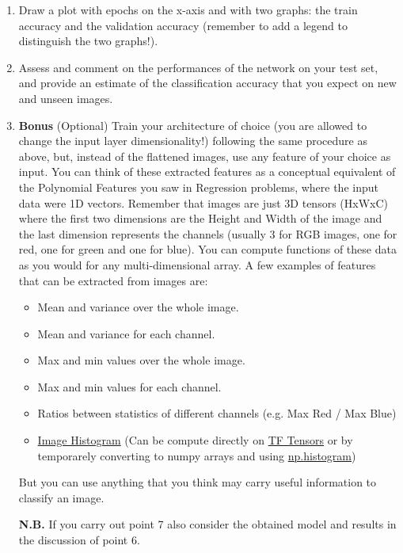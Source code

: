 \documentclass[11pt]{scrartcl}
\begin{document}
\begin{enumerate}
\item Draw a plot with epochs on the x-axis and with two graphs: the train accuracy and the validation accuracy (remember to add a legend to distinguish the two graphs!).
\item Assess and comment on the performances of the network on your test set, and provide an estimate of the classification accuracy that you expect on new and unseen images. 
\item \textbf{Bonus} (Optional) Train your architecture of choice (you are allowed to change the input layer dimensionality!) following the same procedure as above, but, instead of the flattened images, use any feature of your choice as input. 
You can think of these extracted features as a conceptual equivalent of the Polynomial Features you saw in Regression problems, where the input data were 1D vectors. 
Remember that images are just 3D tensors (HxWxC) where the first two dimensions are the Height and Width of the image and the last dimension represents the channels (usually 3 for RGB images, one for red, one for green and one for blue). 
You can compute functions of these data as you would for any multi-dimensional array. 
A few examples of features that can be extracted from images are:
\begin{itemize}
	\item Mean and variance over the whole image.
	\item Mean and variance for each channel.
	\item Max and min values over the whole image.
	\item Max and min values for each channel.
	\item Ratios between statistics of different channels (e.g. Max Red / Max Blue)
	\item \href{https://en.wikipedia.org/wiki/Image_histogram}{Image Histogram} (Can be compute directly on \href{https://www.tensorflow.org/api_docs/python/tf/histogram_fixed_width}{TF Tensors} or by temporarely converting to numpy arrays and using \href{https://numpy.org/doc/stable/reference/generated/numpy.histogram.html}{np.histogram})
\end{itemize}
But you can use anything that you think may carry useful information to classify an image.

\textbf{N.B.} If you carry out point 7 also consider the obtained model and results in the discussion of point 6.
\end{enumerate}

\newpage
\end{document}
